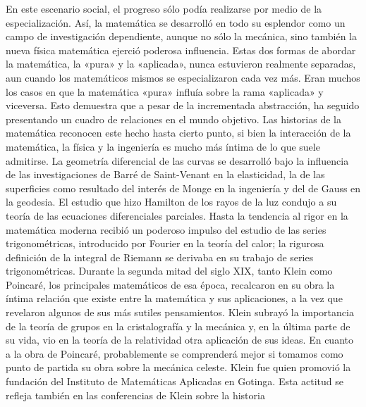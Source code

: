 \documentclass[a4paper, 12pt]{article}
\begin{document}
En este escenario social, el progreso sólo podía realizarse por medio de la
especialización. Así, la matemática se desarrolló en todo su esplendor como un
campo de investigación dependiente, aunque no sólo la mecánica, sino también la
nueva física matemática ejerció poderosa influencia. Estas dos formas de abordar
la matemática, la «pura» y la «aplicada», nunca estuvieron realmente separadas,
aun cuando los matemáticos mismos se especializaron cada vez más. Eran muchos
los casos en que la matemática «pura» influía sobre la rama «aplicada»  y
viceversa. Esto demuestra que a pesar de la incrementada abstracción, ha seguido
presentando un cuadro de relaciones en el mundo objetivo. Las historias de la
matemática reconocen este hecho hasta cierto punto, si bien la interacción de la
matemática, la física y la ingeniería es mucho más íntima de lo que suele
admitirse. La geometría diferencial de las curvas se desarrolló bajo la
influencia de las investigaciones de Barré de Saint-Venant en la elasticidad, la
de las superficies como resultado del interés de Monge en la ingeniería y del de
Gauss en la geodesia. El estudio que hizo Hamilton de los rayos de la luz
condujo a su teoría de las ecuaciones diferenciales parciales. Hasta la
tendencia al rigor en la matemática moderna recibió un poderoso impulso del
estudio de las series trigonométricas, introducido por Fourier en la teoría del
calor; la rigurosa definición de la integral de Riemann se derivaba en su
trabajo de series trigonométricas. Durante la segunda mitad del siglo XIX, tanto
Klein como Poincaré, los principales matemáticos de esa época, recalcaron en su
obra la íntima relación que existe entre la matemática y sus aplicaciones, a la
vez que revelaron algunos de sus más sutiles pensamientos. Klein subrayó la
importancia de la teoría de grupos en la cristalografía y la mecánica y, en la
última parte de su vida, vio en la teoría de la relatividad otra aplicación de
sus ideas. En cuanto a la obra de Poincaré, probablemente se comprenderá mejor
si tomamos como punto de partida su obra sobre la mecánica celeste. Klein fue
quien promovió la fundación del Instituto de Matemáticas Aplicadas en Gotinga.
Esta actitud se refleja también en las conferencias de Klein sobre la historia
\end{document}
